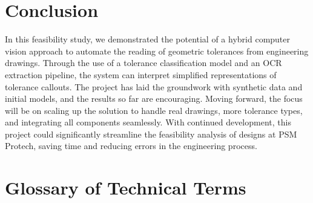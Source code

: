 \documentclass[11pt,a4paper]{article}
\begin{document}
\section{Conclusion}
In this feasibility study, we demonstrated the potential of a hybrid computer vision approach to automate the reading of geometric tolerances from engineering drawings. Through the use of a tolerance classification model and an OCR extraction pipeline, the system can interpret simplified representations of tolerance callouts. The project has laid the groundwork with synthetic data and initial models, and the results so far are encouraging. Moving forward, the focus will be on scaling up the solution to handle real drawings, more tolerance types, and integrating all components seamlessly. With continued development, this project could significantly streamline the feasibility analysis of designs at PSM Protech, saving time and reducing errors in the engineering process.

\section{ Glossary of Technical Terms}
\end{document}
